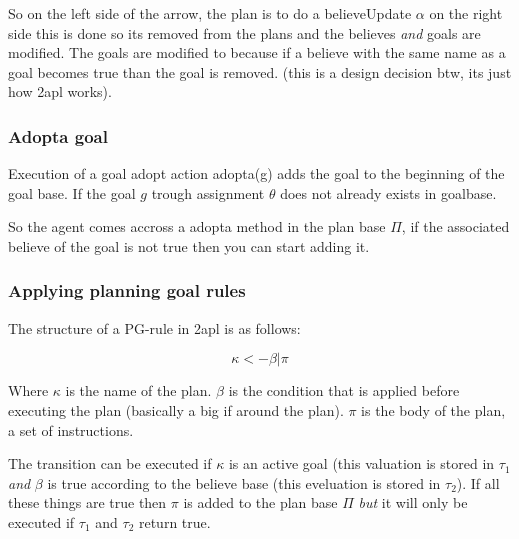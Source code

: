 \documentclass{article}
\begin{document}
So on the left side of the arrow, the plan is to do a believeUpdate $\alpha$
on the right side this is done so its removed from the plans and the believes
\emph{and} goals are modified. The goals are modified to because if a believe
with the same name as a goal becomes true than the goal is removed. (this is
a design decision btw, its just how 2apl works).

\subsubsection{Adopta goal}
Execution of a goal adopt action adopta(g) adds the goal to the beginning of
the goal base. If the goal $g$ trough assignment $\theta$ does not already
exists in goalbase.

\begin{prooftree}
\end{prooftree}

So the agent comes accross a adopta method in the plan base $\Pi$, if
the associated believe of the goal is not true then you can start adding
it.
\subsubsection{Applying planning goal rules}
The structure of a PG-rule in 2apl is as follows:

\[\kappa <- \beta | \pi \]

Where $\kappa$ is the name of the plan.
$\beta$ is the condition that is applied before
executing the plan (basically a big if around the plan). $\pi$ is
the body of the plan, a set of instructions.

\begin{prooftree}
\end{prooftree}

The transition can be executed if $\kappa$ is an active goal (this valuation
is stored in $\tau_1$ \emph{and} $\beta$ is true according to the believe 
base (this eveluation is stored in $\tau_2$). If all these things are true
then $\pi$ is added to the plan base $\Pi$ \emph{but} it will only be executed
if $\tau_1$ and $\tau_2$ return true.
\end{document}
